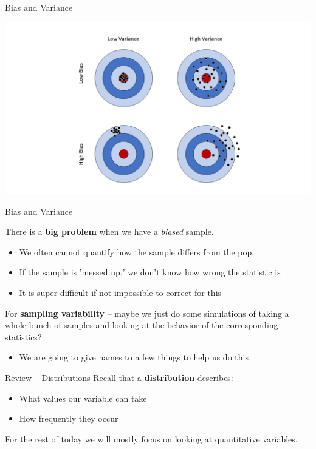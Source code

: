 \documentclass{beamer}
\begin{document}
\begin{frame}{Bias and Variance}
\begin{center}
\includegraphics[scale=0.35]{biasVariabilityTargets.png}
\end{center}
\end{frame}

\begin{frame}{Bias and Variance}
\noindent{} \vspace{6mm}

There is a \textbf{big problem} when we have a \textit{biased} sample.
\begin{itemize}
    \item We often cannot quantify how the sample differs from the pop.
    \item If the sample is 'messed up,' we don't know how wrong the statistic is
    \item It is super difficult if not impossible to correct for this
\end{itemize} \vspace{6mm}

For \textbf{sampling variability} -- maybe we just do some simulations of taking a whole bunch of samples and looking at the behavior of the corresponding statistics?
\begin{itemize}
    \item We are going to give names to a few things to help us do this
\end{itemize}
\end{frame}

\begin{frame}{Review -- Distributions}
Recall that a \textbf{distribution} describes:
\begin{itemize}
    \item What values our variable can take
    \item How frequently they occur
\end{itemize} \vspace{10mm}

For the rest of today we will mostly focus on looking at quantitative variables.
\end{frame}
\end{document}
